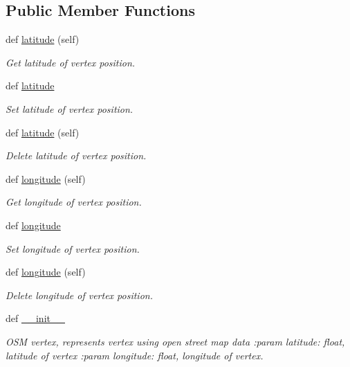 \subsection*{Public Member Functions}
\begin{DoxyCompactItemize}
\item 
def \hyperlink{classbridges_1_1data__src__dependent_1_1osm_1_1_osm_vertex_a31eefda235d8c4dd065ee5200897b473}{latitude} (self)
\begin{DoxyCompactList}\small\item\em Get latitude of vertex position. \end{DoxyCompactList}\item 
def \hyperlink{classbridges_1_1data__src__dependent_1_1osm_1_1_osm_vertex_add07a32c4c5e0f4af70d790cffa9a6d9}{latitude}
\begin{DoxyCompactList}\small\item\em Set latitude of vertex position. \end{DoxyCompactList}\item 
def \hyperlink{classbridges_1_1data__src__dependent_1_1osm_1_1_osm_vertex_a31eefda235d8c4dd065ee5200897b473}{latitude} (self)
\begin{DoxyCompactList}\small\item\em Delete latitude of vertex position. \end{DoxyCompactList}\item 
def \hyperlink{classbridges_1_1data__src__dependent_1_1osm_1_1_osm_vertex_aca0aff0932e5436a0f72e53a93fe8f42}{longitude} (self)
\begin{DoxyCompactList}\small\item\em Get longitude of vertex position. \end{DoxyCompactList}\item 
def \hyperlink{classbridges_1_1data__src__dependent_1_1osm_1_1_osm_vertex_acf84d4c73cbffae355ec49c03b3f48c7}{longitude}
\begin{DoxyCompactList}\small\item\em Set longitude of vertex position. \end{DoxyCompactList}\item 
def \hyperlink{classbridges_1_1data__src__dependent_1_1osm_1_1_osm_vertex_aca0aff0932e5436a0f72e53a93fe8f42}{longitude} (self)
\begin{DoxyCompactList}\small\item\em Delete longitude of vertex position. \end{DoxyCompactList}\item 
def \hyperlink{classbridges_1_1data__src__dependent_1_1osm_1_1_osm_vertex_a64fa8f3bfc7df74b5fa93bcc7326e6ac}{\+\_\+\+\_\+init\+\_\+\+\_\+}
\begin{DoxyCompactList}\small\item\em O\+SM vertex, represents vertex using open street map data \+:param latitude\+: float, latitude of vertex \+:param longitude\+: float, longitude of vertex. \end{DoxyCompactList}\end{DoxyCompactItemize}
